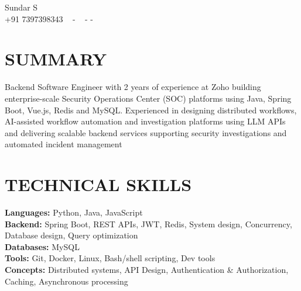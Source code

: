 \documentclass[letterpaper,11pt]{article}
\begin{document}

\vspace{-20px}
\begin{center}
    {\huge Sundar S} \\ \vspace{2pt} 
    {+91 7397398343} ~ 
    \small{-}
    \href{mailto:[sundarselvam3@gmail.com]}{\color{blue}{sundarselvam3@gmail.com}} ~ 
    \small{-}
    \href{https://www.linkedin.com/in/sundar-s-870042235/}{ \color{blue}{LinkedIn}}
    \small{-}
    \href{https://github.com/Sundar0603}{ \color{blue}{GitHub}} ~
    \vspace{-7pt}
\end{center}


\section{\color{airforceblue}SUMMARY} 
Backend Software Engineer with 2 years of experience at Zoho building enterprise-scale Security Operations Center (SOC) platforms using Java, Spring Boot, Vue.js, Redis and MySQL. Experienced in designing distributed workflows, AI-assisted workflow automation and investigation platforms using LLM APIs and delivering scalable backend services supporting security investigations and automated incident management
\vspace{-10pt}



\section{\color{airforceblue}TECHNICAL SKILLS}
 \begin{itemize}[leftmargin=0in, label={}]
    \small{\item{
     \textbf{\normalsize{Languages:}}{ \normalsize{Python, Java, JavaScript}} \\
      \textbf{\normalsize{Backend:}}{ \normalsize{Spring Boot, REST APIs, JWT, Redis, System design, Concurrency,  Database design, Query optimization}} \\
      \textbf{\normalsize{Databases:}}{ \normalsize{MySQL}} \\
      \textbf{\normalsize{Tools:}}{ \normalsize{Git, Docker, Linux, Bash/shell scripting, Dev tools}} \\
      \textbf{\normalsize{Concepts:}}{ \normalsize{Distributed systems, API Design, Authentication \& Authorization, Caching, Asynchronous processing}} \\

     }}
 \end{itemize}
 \vspace{-18pt}
 
\end{document}

